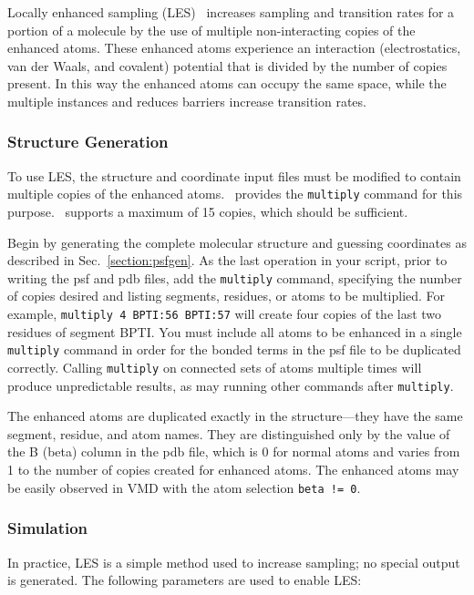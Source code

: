 Locally enhanced sampling (LES)~\cite{ROIT91,SIMM98,SIMM00} increases
sampling and transition rates for a portion of a molecule by the use of
multiple non-interacting copies of the enhanced atoms.  These enhanced
atoms experience an interaction (electrostatics, van der Waals, and
covalent) potential that is divided by the number of copies present.
In this way the enhanced atoms can occupy the same space, while the
multiple instances and reduces barriers increase transition rates.

\subsubsection{Structure Generation}

To use LES, the structure and coordinate input files must be modified to
contain multiple copies of the enhanced atoms.  \PSFGEN\ provides the
{\tt multiply} command for this purpose.  \NAMD\ supports a maximum of 15
copies, which should be sufficient.  

Begin by generating the complete molecular structure and guessing
coordinates as described in Sec.~\ref{section:psfgen}.  As the last
operation in your script, prior to writing the psf and pdb files, add
the {\tt multiply} command, specifying the number of copies desired and
listing segments, residues, or atoms to be multiplied.  For example,
\verb#multiply 4 BPTI:56 BPTI:57# will create four copies of the last
two residues of segment BPTI.  You must include all atoms to be
enhanced in a single {\tt multiply} command in order for the bonded
terms in the psf file to be duplicated correctly.  Calling {\tt multiply}
on connected sets of atoms multiple times will produce unpredictable
results, as may running other commands after {\tt multiply}.

The enhanced atoms are duplicated exactly in the structure---they have
the same segment, residue, and atom names.  They are distinguished only
by the value of the B (beta) column in the pdb file, which is 0 for
normal atoms and varies from 1 to the number of copies created for
enhanced atoms.  The enhanced atoms may be easily observed in VMD with
the atom selection \verb#beta != 0#.

\subsubsection{Simulation}

In practice, LES is a simple method used to increase sampling;
no special output is generated.
The following parameters are used to enable LES:

